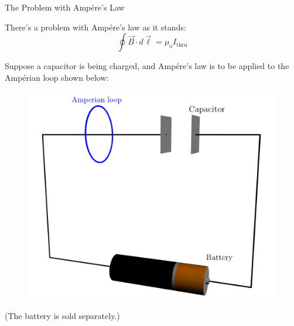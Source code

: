 \documentclass{beamer}
\begin{document}
\begin{frame}{The Problem with Amp{\'e}re's Law}

There's a problem with Amp{\'e}re's law as it stands:
\begin{equation*}
    \oint \vec{B} \cdot d\vec{\ell} = \mu_o I_{\text{thru}}
\end{equation*}

Suppose a capacitor is being charged, and Amp{\'e}re's law is to be applied to the Amp{\'e}rian loop shown below:

\begin{figure}[H]
\centering
\includegraphics[width=0.5\textheight]{figures/duracell_base.png}
\end{figure}

(The battery is sold separately.)

\end{frame}
\end{document}
